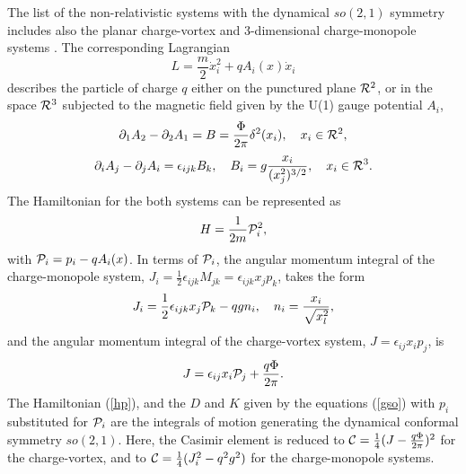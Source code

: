 \documentclass[a4paper,12pt]{article}
\begin{document}
The list of the non-relativistic
systems with the dynamical $so(2,1)$ symmetry
includes also the
planar charge-vortex \cite{Jackv} and $3$-dimensional
charge-monopole systems \cite{Jackm,mp}.
The corresponding Lagrangian
\begin{equation}
L=\frac{m}{2}\dot x_i^2+qA_i(x)\dot x_i
\label{vormon}
\end{equation}
describes the particle of charge $q$
either
on the punctured plane
${\cal R}^2$, or in the space
${\cal R}^3$
subjected to the magnetic field
given by  the U(1) gauge potential
$A_i$,
\begin{equation}
\partial_1 A_2-\partial_2 A_1=B=
\frac{\Phi}{2\pi}\delta^{2}(x_i),\quad
x_i\in{\cal R}^2,
\label{avor}
\end{equation}
\begin{equation}
\partial_i A_j-\partial_j A_i=\epsilon_{ijk}B_k,\quad
B_i=g\frac{x_i}{(x_j^2)^{3/2}},\quad
x_i\in {\cal R}^3.
\label{amon}
\end{equation}
The Hamiltonian for the both systems
can be represented as
\begin{equation}
H=\frac{1}{2m}{\cal P}_i^2,
\label{hp}
\end{equation}
with
${\cal P}_i=p_i-qA_i(x)$.
In terms of ${\cal P}_i$,
the angular momentum integral
of the charge-monopole system,
$J_i=\frac{1}{2}\epsilon_{ijk}M_{jk}=\epsilon_{ijk}x_jp_k$,
takes the form
\begin{equation}
J_i=\frac{1}{2}\epsilon_{ijk}x_j{\cal P}_k-
qg n_i,\quad n_i=\frac{x_i}{\sqrt{x_l^2}},
\label{jmono}
\end{equation}
and the angular momentum integral of the
charge-vortex system,
$J=\epsilon_{ij}x_i p_j$,
is
$$
J=\epsilon_{ij}x_i{\cal P}_j
+\frac{q\Phi}{2\pi}.
$$
The Hamiltonian (\ref{hp}), and the $D$ and $K$ given by the
equations
(\ref{gso}) with $p_i$ substituted for
${\cal P}_i$
are the integrals of motion
generating the dynamical
conformal symmetry $so(2,1)$.
Here, the Casimir element is reduced to
$
{\cal C}=\frac{1}{4}(J-\frac{q\Phi}{2\pi})^2
$
for the charge-vortex, and to
$
{\cal C}=\frac{1}{4}(J_i^2-q^2g^2)
$
for the charge-monopole systems.
\end{document}
